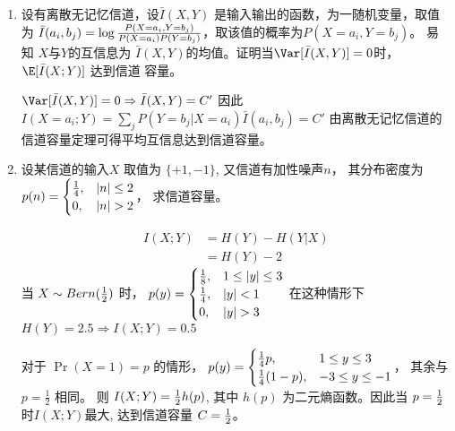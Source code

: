 \documentclass[a4paper]{article}
\DeclarePairedDelimiter\abs{\lvert}{\rvert}
\begin{document}
\courseheader
{}


\begin{enumerate}[label = \arabic*]
  \setlength{\itemsep}{3\parskip}
\item 设有离散无记忆信道，设$\bar{I}(X,Y)$ 是输入输出的函数，为一随机变量，取值为
$\bar{I}(a_i, b_j) = \log { P(X = a_i, Y = b_j) \over P(X=a_i) P(Y=b_j) }$，取该值的概率为$P(X = a_i, Y=b_j)$。
易知 $X$与$Y$的互信息为 $\bar{I}(X,Y)$的均值。证明当$\Var[\bar{I}(X, Y)] = 0$时， $\E[ \bar{I}(X; Y) ] $ 达到信道
容量。
\begin{solution}
$ \Var[\bar{I}(X, Y)] = 0 \Rightarrow \bar{I}(X,Y)  = C' $ 因此 $I(X=a_i; Y) = \sum_{j} P(Y=b_j | X = a_i) \bar{I}(a_i, b_j) = C' $
由离散无记忆信道的信道容量定理可得平均互信息达到信道容量。 
\end{solution}
  \item 设某信道的输入$X$ 取值为 $\{ +1, -1 \}$, 又信道有加性噪声$n$， 其分布密度为 $ p(n) = \begin{cases}
  { 1 \over 4} , & \abs{n} \leq 2 \\ 0, & \abs{n} > 2 \end{cases}$， 求信道容量。
  \begin{solution}
  \begin{align*}
  I(X;Y) & = H(Y) - H(Y|X) \\
  & = H(Y) - 2
 \end{align*}
 当 $X\sim Bern({1 \over 2})$ 时，
 $ p(y) =  \begin{cases} { 1\over 8}, & 1 \leq \abs{y}\leq 3 \\
 { 1 \over 4}, & \abs{y} < 1 \\
 0, & \abs{y} > 3 
 \end{cases} $
 在这种情形下 $ H(Y) = 2.5 \Rightarrow I(X; Y) = 0.5$

 对于 $\Pr( X = 1 ) = p $ 的情形， $ p(y) = \begin{cases} { 1 \over 4 } p, & 1 \leq y \leq 3 \\ {1 \over 4} (1-p), & -3 \leq y \leq -1 
 \end{cases} $， 其余与 $ p = \frac{1}{2} $ 相同。 则
 $ I(X;Y) = {1 \over 2} h(p) $, 其中 $h(p)$ 为二元熵函数。因此当 $ p = { 1 \over 2} $时$I(X;Y)$最大, 达到信道容量 $ 
 C = {1 \over 2} $。
 \end{solution}
 

\end{enumerate}
\end{document}
